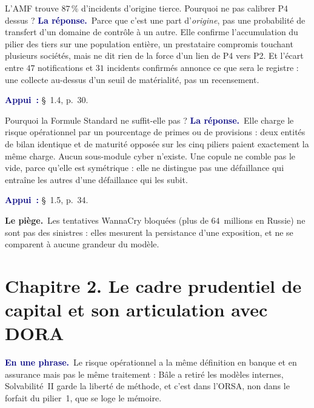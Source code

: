 \documentclass[11pt,a4paper]{article}
\newcommand{\lepiege}[1]{\smallskip\noindent\textcolor{accent}{\textbf{Le piège.}}\ #1\par}
\newcommand{\rep}[1]{\smallskip\noindent\textcolor{navy}{\textbf{La réponse.}}\ #1\par}
\newcommand{\appui}[1]{\smallskip\noindent\small\textcolor{navy}{\textbf{Appui~:}} #1\par\normalsize}
\newcommand{\reperes}[1]{\noindent{\small\color{navy!75}#1}\par\smallskip}
\newcommand{\enbref}[1]{\noindent\textcolor{navy}{\textbf{En une phrase.}}\ #1\par}
\begin{document}
\begin{question}{\og L'AMF trouve $87\,\%$ d'incidents d'origine tierce. Pourquoi ne pas calibrer P4 dessus ?\fg{}}
\rep{Parce que c'est une part d'\emph{origine}, pas une probabilité de transfert d'un domaine de
contrôle à un autre. Elle confirme l'accumulation du pilier des tiers sur une population
entière, un prestataire compromis touchant plusieurs sociétés, mais ne dit rien de la force d'un
lien de P4 vers P2. Et l'écart entre $47$ notifications et $31$ incidents confirmés annonce ce que
sera le registre : une collecte au-dessus d'un seuil de matérialité, pas un recensement.}
\appui{\S~1.4, p.~30.}
\end{question}

\begin{question}{\og Pourquoi la Formule Standard ne suffit-elle pas ?\fg{}}
\rep{Elle charge le risque opérationnel par un pourcentage de primes ou de provisions : deux
entités de bilan identique et de maturité opposée sur les cinq piliers paient exactement la même
charge. Aucun sous-module cyber n'existe. Une copule ne comble pas le vide, parce qu'elle est
symétrique : elle ne distingue pas une défaillance qui entraîne les autres d'une défaillance qui
les subit.}
\appui{\S~1.5, p.~34.}
\end{question}

\lepiege{Les tentatives WannaCry bloquées (plus de $64$~millions en Russie) ne sont pas des
sinistres : elles mesurent la persistance d'une exposition, et ne se comparent à aucune grandeur
du modèle.}

\section*{Chapitre 2. Le cadre prudentiel de capital et son articulation avec DORA}
\reperes{p.~36 et 37.}

\enbref{Le risque opérationnel a la même définition en banque et en assurance mais pas le même
traitement : Bâle a retiré les modèles internes, Solvabilité~II garde la liberté de méthode, et
c'est dans l'ORSA, non dans le forfait du pilier~1, que se loge le mémoire.}
\end{document}
